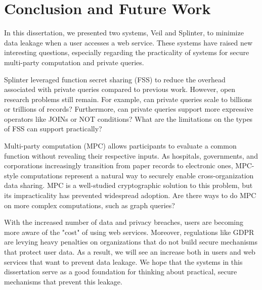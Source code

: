 \section{Conclusion and Future Work}
\label{chap:concl}

In this dissertation, we presented two systems, Veil and Splinter,
to minimize data leakage when a user accesses a web service. 
These systems have raised new interesting questions,
especially regarding the practicality of 
systems for secure multi-party computation and private queries.

Splinter leveraged
function secret sharing (FSS) to reduce the overhead associated with private queries compared to previous
work. However, open research problems still remain. For example, can private queries scale to billions
or trillions of records? Furthermore, can private queries support more expressive operators like JOINs or
NOT conditions? What are the limitations on the types of FSS can support practically?

Multi-party computation (MPC) allows participants to evaluate a common function without revealing
their respective inputs. As hospitals, governments, and corporations increasingly transition from
paper records to electronic ones, MPC-style computations represent a natural way to securely enable
cross-organization data sharing. MPC is a well-studied cryptographic solution to this problem, but its
impracticality has prevented widespread adoption. Are there ways to do MPC on more complex
computations, such as graph queries?

With the increased number of data and privacy breaches, users are becoming
more aware of the "cost" of using web services. Moreover, regulations like
GDPR are levying heavy penalties on organizations that do not build
secure mechanisms that protect user data. As a result, we will see
an increase both in users and web services that want to prevent data leakage.
We hope that the systems in this dissertation serve
as a good foundation for thinking about practical, secure mechanisms
that prevent this leakage.